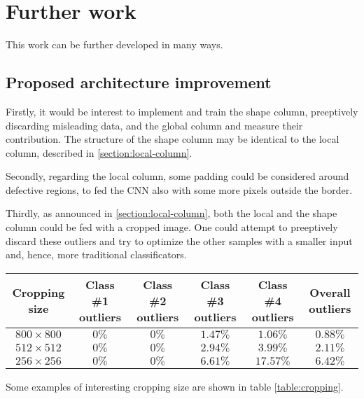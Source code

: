 \section{Further work}\label{section:further-work}
    \par{
        This work can be further developed in many ways.
    }
    \subsection{Proposed architecture improvement}
    \par{
        Firstly, it would be interest to implement and train the shape column, preeptively discarding misleading data, and the global column and measure their contribution. The structure of the shape column may be identical to the local column, described in \ref{section:local-column}.
    }
    \par{
        Secondly, regarding the local column, some padding could be considered around defective regions, to fed the CNN also with some more pixels outside the border.
    }
    \par{
        Thirdly, as announced in \ref{section:local-column}, both the local and the shape column could be fed with a cropped image. One could attempt to preeptively discard these outliers and try to optimize the other samples with a smaller input and, hence, more traditional classificators.
    }
    \begin{table*}
        \centering
        \begin{tabular}{|c|c|c|c|c|c|}
            \hline
            \textbf{Cropping size} & \textbf{Class \#1 outliers} & \textbf{Class \#2 outliers}& \textbf{Class \#3 outliers} & \textbf{Class \#4 outliers} & \textbf{Overall outliers}\\\hline
            $800\times 800$ & $0\%$ & $0\%$ & $1.47\%$ & $1.06\%$ & $0.88\%$\\
            $512\times 512$ & $0\%$ & $0\%$ & $2.94\%$ & $3.99\%$ & $2.11\%$\\
            $256\times 256$ & $0\%$ & $0\%$ & $6.61\%$ & $17.57\%$& $6.42\%$\\
            \hline
        \end{tabular}
        \vspace{0.5cm}
        \caption{Cropping examples.}\label{table:cropping}
    \end{table*}
    \par{
        Some examples of interesting cropping size are shown in table \ref{table:cropping}.
    }
